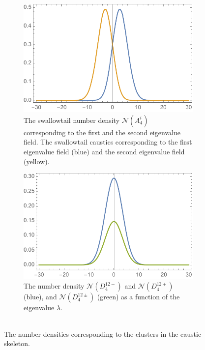 \documentclass[a4paper, 11pt]{article}
\begin{document}
\begin{figure}
\centering
\begin{subfigure}[b]{0.49\textwidth}
\includegraphics[width=\textwidth]{A4NumberDensity}
\caption{The swallowtail number density $\mathcal{N}(A_4^i)$ corresponding to the first and the second eigenvalue field. The swallowtail caustics corresponding to the first eigenvalue field (blue) and the second eigenvalue field (yellow).}
\end{subfigure}
\begin{subfigure}[b]{0.49\textwidth}
\includegraphics[width=\textwidth]{D4NumberDensity}
\caption{The number density $\mathcal{N}(D_4^{12-})$ and $\mathcal{N}(D_4^{12+})$ (blue), and $\mathcal{N}(D_4^{12\pm})$ (green) as a function of the eigenvalue $\lambda$.\\$ $\\}
\end{subfigure}
\caption{The number densities corresponding to the clusters in the caustic skeleton.}
\label{fig:clusternumberdensities}
\end{figure}
\end{document}
